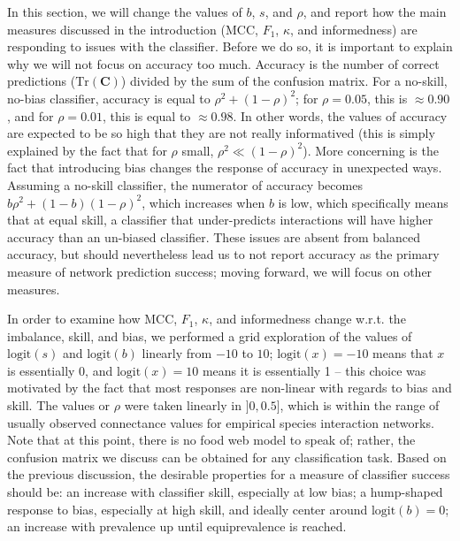 \documentclass[10pt,oneside]{article}
\begin{document}
In this section, we will change the values of \(b\), \(s\), and
\(\rho\), and report how the main measures discussed in the introduction
(MCC, \(F_1\), \(\kappa\), and informedness) are responding to issues
with the classifier. Before we do so, it is important to explain why we
will not focus on accuracy too much. Accuracy is the number of correct
predictions (\(\text{Tr}(\mathbf{C})\)) divided by the sum of the
confusion matrix. For a no-skill, no-bias classifier, accuracy is equal
to \(\rho^2 + (1-\rho)^2\); for \(\rho = 0.05\), this is
\(\approx 0.90\), and for \(\rho = 0.01\), this is equal to
\(\approx 0.98\). In other words, the values of accuracy are expected to
be so high that they are not really informatived (this is simply
explained by the fact that for \(\rho\) small,
\(\rho^2 \ll (1-\rho)^2\)). More concerning is the fact that introducing
bias changes the response of accuracy in unexpected ways. Assuming a
no-skill classifier, the numerator of accuracy becomes
\(b\rho^2 + (1-b)(1-\rho)^2\), which increases when \(b\) is low, which
specifically means that at equal skill, a classifier that under-predicts
interactions will have higher accuracy than an un-biased classifier.
These issues are absent from balanced accuracy, but should nevertheless
lead us to not report accuracy as the primary measure of network
prediction success; moving forward, we will focus on other measures.

In order to examine how MCC, \(F_1\), \(\kappa\), and informedness
change w.r.t. the imbalance, skill, and bias, we performed a grid
exploration of the values of \(\text{logit}(s)\) and \(\text{logit}(b)\)
linearly from \(-10\) to \(10\); \(\text{logit}(x) = -10\) means that
\(x\) is essentially 0, and \(\text{logit}(x) = 10\) means it is
essentially 1 -- this choice was motivated by the fact that most
responses are non-linear with regards to bias and skill. The values or
\(\rho\) were taken linearly in \(]0, 0.5]\), which is within the range
of usually observed connectance values for empirical species interaction
networks. Note that at this point, there is no food web model to speak
of; rather, the confusion matrix we discuss can be obtained for any
classification task. Based on the previous discussion, the desirable
properties for a measure of classifier success should be: an increase
with classifier skill, especially at low bias; a hump-shaped response to
bias, especially at high skill, and ideally center around
\(\text{logit}(b)=0\); an increase with prevalence up until
equiprevalence is reached.
\end{document}
